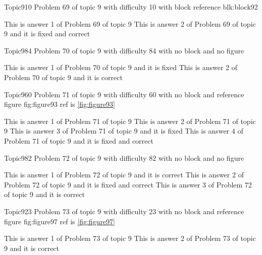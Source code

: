\documentclass[master]{exam}
\begin{document}
\begin{problem}[requires=blk:block92]{Topic9}{10}
	Problem 69 of topic 9 with difficulty 10 with block reference blk:block92
	\begin{answers}
		\answer This is answer 1 of Problem 69 of topic 9 
		 This is answer 2 of Problem 69 of topic 9 and it is fixed and correct
	\end{answers}
\end{problem}

\begin{problem}{Topic9}{84}
	Problem 70 of topic 9 with difficulty 84 with no block and no figure
	\begin{answers}
		\answer[fixed] This is answer 1 of Problem 70 of topic 9 and it is fixed
		\answer[correct] This is answer 2 of Problem 70 of topic 9 and it is correct
	\end{answers}
\end{problem}

\begin{problem}{Topic9}{60}
	Problem 71 of topic 9 with difficulty 60 with no block and reference figure fig:figure93 ref is \ref{fig:figure93}
	\begin{answers}
		\answer This is answer 1 of Problem 71 of topic 9 
		\answer This is answer 2 of Problem 71 of topic 9 
		\answer[fixed] This is answer 3 of Problem 71 of topic 9 and it is fixed
		 This is answer 4 of Problem 71 of topic 9 and it is fixed and correct
	\end{answers}
\end{problem}

\begin{problem}{Topic9}{82}
	Problem 72 of topic 9 with difficulty 82 with no block and no figure
	\begin{answers}
		\answer[correct] This is answer 1 of Problem 72 of topic 9 and it is correct
		 This is answer 2 of Problem 72 of topic 9 and it is fixed and correct
		\answer[correct] This is answer 3 of Problem 72 of topic 9 and it is correct
	\end{answers}
\end{problem}

\begin{problem}{Topic9}{23}
	Problem 73 of topic 9 with difficulty 23 with no block and reference figure fig:figure97 ref is \ref{fig:figure97}
	\begin{answers}
		\answer This is answer 1 of Problem 73 of topic 9 
		\answer[correct] This is answer 2 of Problem 73 of topic 9 and it is correct
	\end{answers}
\end{problem}
\end{document}

